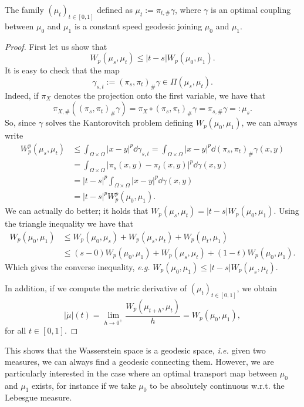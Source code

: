 \begin{lemma}
	\label{lemma.characterization_const_speed_geo}
	The family $(\mu_t)_{t \in [0,1]}$ defined as $\mu_t := \pi_{t,\#}\gamma$, where $\gamma$ is an optimal coupling between $\mu_0$ and $\mu_1$ is a constant speed geodesic joining $\mu_0$ and $\mu_1$. 
\end{lemma}
\begin{proof}
	First let us show that
	\begin{equation*}
	W_p(\mu_s, \mu_t) \le |t-s|W_p(\mu_0, \mu_1).
	\end{equation*}
	It is easy to check that the map 
	\begin{equation*}
	\gamma_{s,t} := (\pi_s, \pi_t)_{\#}\gamma \in \Pi(\mu_s, \mu_t). 
	\end{equation*}
	Indeed, if $\pi_X$ denotes the projection onto the first variable, we have that 
	$$
	\pi_{X,\#}\left((\pi_s, \pi_t)_{\#}\gamma\right) 
	= 
	\pi_{X}\circ(\pi_s, \pi_t)_{\#}\gamma = \pi_{s,\#}\gamma =: \mu_s.
	$$ 
	So, since $\gamma$ solves the Kantorovitch problem defining $W_p(\mu_0, \mu_1)$, we can always write
	\begin{align*}
	W^p_p(\mu_s, \mu_t) 
	&\le \int_{\Omega\times \Omega} |x - y|^p\dd \gamma_{s,t} 
	= \int_{\Omega\times \Omega} |x - y|^p\dd (\pi_s, \pi_t)_{\#}\gamma(x,y)\\
	&= \int_{\Omega\times \Omega} |\pi_s(x,y) - \pi_t(x,y)|^p\dd \gamma(x,y)\\
	&= |t-s|^p \int_{\Omega\times \Omega} |x-y|^p\dd \gamma(x,y)\\
	&= |t-s|^pW_p^p(\mu_0, \mu_1).
	\end{align*}
	We can actually do better; it holds that $W_p(\mu_s, \mu_t) = |t-s|W_p(\mu_0, \mu_1)$. Using the triangle inequality we have that 
	\begin{align*}
	W_p(\mu_0, \mu_1) 
	&\le W_p(\mu_0, \mu_s) + W_p(\mu_s, \mu_t) + W_p(\mu_t, \mu_1)\\
	&\le (s - 0)W_p(\mu_0, \mu_1) + W_p(\mu_s, \mu_t) + (1- t)W_p(\mu_0, \mu_1).
	\end{align*} 
	Which gives the converse inequality, {\em e.g.} $W_p(\mu_0, \mu_1) \le |t - s|W_p(\mu_s, \mu_t)$.
	
	In addition, if we compute the metric derivative of $\left(\mu_t\right)_{t \in [0,1]}$, we obtain 
	\begin{equation*}
	|\dot{\mu}|(t) = \lim_{h \to 0^+} \frac{W_p(\mu_{t+h}, \mu_{t})}{h} = W_p(\mu_0, \mu_1),
	\end{equation*}
	for all $t \in [0,1]$. 
\end{proof}
This shows that the Wasserstein space is a geodesic space, {\em i.e.} given two measures, we can always find a geodesic connecting them. However, we are particularly interested in the case where an optimal transport map between $\mu_0$ and $\mu_1$ exists, for instance if we take $\mu_0$ to be absolutely continuous w.r.t. the Lebesgue measure. 

